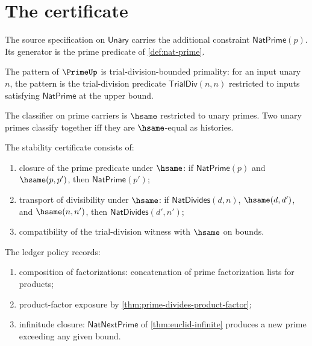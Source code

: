 \section{The certificate}

\begin{definition}
\label{def:prime-source-specification}
The source specification on \(\mathsf{Unary}\) carries the additional constraint \(\mathsf{NatPrime}(p)\). Its generator is the prime predicate of \autoref{def:nat-prime}.
\end{definition}

\begin{definition}
\label{def:prime-pattern-specification}
The pattern of \(\PrimeUp\) is trial-division-bounded primality: for an input unary \(n\), the pattern is the trial-division predicate \(\mathsf{TrialDiv}(n, n)\) restricted to inputs satisfying \(\mathsf{NatPrime}\) at the upper bound.
\end{definition}

\begin{definition}
\label{def:prime-classifier-specification}
The classifier on prime carriers is \(\hsame\) restricted to unary primes. Two unary primes classify together iff they are \(\hsame\)-equal as histories.
\end{definition}

\begin{definition}
\label{def:prime-stability-certificate}
The stability certificate consists of:
\begin{enumerate}
  \item closure of the prime predicate under \(\hsame\): if \(\mathsf{NatPrime}(p)\) and \(\hsame(p, p')\), then \(\mathsf{NatPrime}(p')\);
  \item transport of divisibility under \(\hsame\): if \(\mathsf{NatDivides}(d, n)\), \(\hsame(d, d')\), and \(\hsame(n, n')\), then \(\mathsf{NatDivides}(d', n')\);
  \item compatibility of the trial-division witness with \(\hsame\) on bounds.
\end{enumerate}
\end{definition}

\begin{definition}
\label{def:prime-ledger-policy}
The ledger policy records:
\begin{enumerate}
  \item composition of factorizations: concatenation of prime factorization lists for products;
  \item product-factor exposure by \autoref{thm:prime-divides-product-factor};
  \item infinitude closure: \(\mathsf{NatNextPrime}\) of \autoref{thm:euclid-infinite} produces a new prime exceeding any given bound.
\end{enumerate}
\end{definition}

